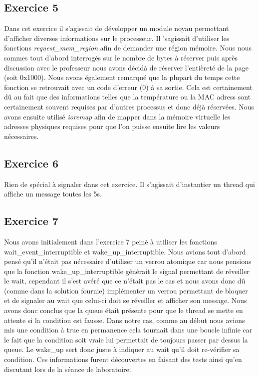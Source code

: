 \documentclass{ReportTemplate}
\begin{document}
\subsection{Exercice 5}
Dans cet exercice il s'agissait de développer un module noyau permettant
d'afficher diverses informations sur le processeur. Il 'sagissait d'utiliser les
fonctions \textit{request\_mem\_region} afin de demander une région mémoire.
Nous nous sommes tout d'abord interrogés sur le nombre de bytes à réserver puis
après discussion avec le professeur nous avons décidà de réserver l'entièreté de
la page (soit 0x1000). Nous avons également remarqué que la plupart du temps
cette fonction se retrouvait avec un code d'erreur (0) à sa sortie. Cela est
certainement dû au fait que des informations telles que la température ou la MAC
adress sont certainement souvent requises par d'autres processus et donc déjà
réservées. Nous avons ensuite utilisé \textit{ioremap} afin de mapper dans la
mémoire virtuelle les adresses physiques requises pour que l'on puisse ensuite
lire les valeurs nécessaires.
\subsection{Exercice 6}
Rien de spécial à signaler dans cet exercice. Il s'agissait d'instantier un
thread qui affiche un message toutes les 5s.
\subsection{Exercice 7}
Nous avons initialement dans l'exercice 7 peiné à utiliser les fonctions
wait\_event\_interruptible et wake\_up\_interruptible. Nous avions tout d'abord
pensé qu'il n'était pas nécessaire d'utiliser un verrou atomique car nous
pensions que la fonction wake\_up\_interruptible générait le signal permettant
de réveiller le wait, cependant il s'est avéré que ce n'était pas le cas et nous
avons donc dû (comme dans la solution fournie) implémenter un verrou permettant
de bloquer et de signaler au wait que celui-ci doit se réveiller et afficher son
message. Nous avons donc conclus que la queue était présente pour que le thread
se mette en attente si la condition est fausse. Dans notre cas, comme au début
nous avions mis une condition à true en permanence cela tournait dans une boucle
infinie car le fait que la condition soit vraie lui permettait de toujours
passer par dessus la queue. Le wake\_up sert donc juste à indiquer au wait qu'il
doit re-vérifier sa condition. Ces informations furent découvertes en faisant
des tests ainsi qu'en discutant lors de la séance de laboratoire.\newline
\newpage
\end{document}
